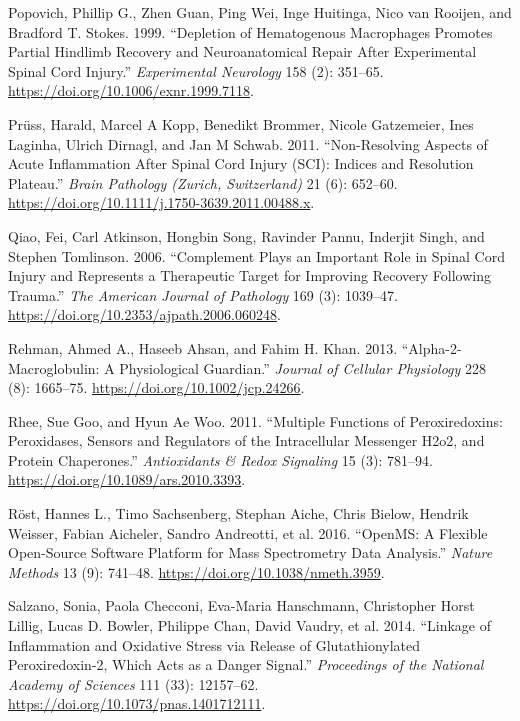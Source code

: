 \documentclass[9pt,lineno]{elife}
\newlength{\cslhangindent}
\newlength{\cslentryspacingunit} %
\newenvironment{CSLReferences}[2] %
 {%
  \setlength{\parindent}{0pt}
  \ifodd #1
  \let\oldpar\par
  \def\par{\hangindent=\cslhangindent\oldpar}
  \fi
  \setlength{\parskip}{#2\cslentryspacingunit}
 }%
 {}
\begin{document}
\begin{landscape}
\begin{landscape}
\begin{landscape}
\begin{landscape}
\begin{CSLReferences}{1}{0}
\leavevmode{}%
Popovich, Phillip G., Zhen Guan, Ping Wei, Inge Huitinga, Nico van Rooijen, and Bradford T. Stokes. 1999. {``Depletion of {Hematogenous Macrophages Promotes Partial Hindlimb Recovery} and {Neuroanatomical Repair} After {Experimental Spinal Cord Injury}.''} \emph{Experimental Neurology} 158 (2): 351--65. \url{https://doi.org/10.1006/exnr.1999.7118}.

\leavevmode{}%
Prüss, Harald, Marcel A Kopp, Benedikt Brommer, Nicole Gatzemeier, Ines Laginha, Ulrich Dirnagl, and Jan M Schwab. 2011. {``Non-Resolving Aspects of Acute Inflammation After Spinal Cord Injury ({SCI}): Indices and Resolution Plateau.''} \emph{Brain Pathology (Zurich, Switzerland)} 21 (6): 652--60. \url{https://doi.org/10.1111/j.1750-3639.2011.00488.x}.

\leavevmode{}%
Qiao, Fei, Carl Atkinson, Hongbin Song, Ravinder Pannu, Inderjit Singh, and Stephen Tomlinson. 2006. {``Complement {Plays} an {Important Role} in {Spinal Cord Injury} and {Represents} a {Therapeutic Target} for {Improving Recovery} Following {Trauma}.''} \emph{The American Journal of Pathology} 169 (3): 1039--47. \url{https://doi.org/10.2353/ajpath.2006.060248}.

\leavevmode{}%
Rehman, Ahmed A., Haseeb Ahsan, and Fahim H. Khan. 2013. {``Alpha-2-Macroglobulin: {A} Physiological Guardian.''} \emph{Journal of Cellular Physiology} 228 (8): 1665--75. \url{https://doi.org/10.1002/jcp.24266}.

\leavevmode{}%
Rhee, Sue Goo, and Hyun Ae Woo. 2011. {``Multiple {Functions} of {Peroxiredoxins}: {Peroxidases}, {Sensors} and {Regulators} of the {Intracellular Messenger H2o2}, and {Protein Chaperones}.''} \emph{Antioxidants \& Redox Signaling} 15 (3): 781--94. \url{https://doi.org/10.1089/ars.2010.3393}.

\leavevmode{}%
Röst, Hannes L., Timo Sachsenberg, Stephan Aiche, Chris Bielow, Hendrik Weisser, Fabian Aicheler, Sandro Andreotti, et al. 2016. {``{OpenMS}: A Flexible Open-Source Software Platform for Mass Spectrometry Data Analysis.''} \emph{Nature Methods} 13 (9): 741--48. \url{https://doi.org/10.1038/nmeth.3959}.

\leavevmode{}%
Salzano, Sonia, Paola Checconi, Eva-Maria Hanschmann, Christopher Horst Lillig, Lucas D. Bowler, Philippe Chan, David Vaudry, et al. 2014. {``Linkage of Inflammation and Oxidative Stress via Release of Glutathionylated Peroxiredoxin-2, Which Acts as a Danger Signal.''} \emph{Proceedings of the National Academy of Sciences} 111 (33): 12157--62. \url{https://doi.org/10.1073/pnas.1401712111}.


\end{CSLReferences}
\end{landscape}
\end{landscape}
\end{landscape}
\end{landscape}
\end{document}
